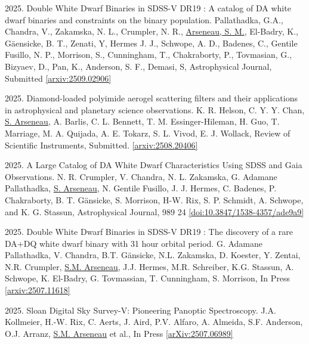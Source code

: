 \documentclass[letterpaper,11pt]{article}
\newenvironment{packed_enumerate}[1][]{
\begin{etaremune}[#1]
  \setlength{\itemsep}{3.7pt}
  \setlength{\parskip}{0pt}
  \setlength{\parsep}{0pt}}{\end{etaremune}
}
\begin{document}
\begin{packed_enumerate}

\item 2025. Double White Dwarf Binaries in SDSS-V DR19 : A catalog of DA white dwarf binaries and constraints on the binary population. Pallathadka, G.A., Chandra, V., Zakamska, N. L., Crumpler, N. R., \underline{Arseneau, S. M.}, El-Badry, K., G\"aensicke, B. T., Zenati, Y, Hermes J. J., Schwope, A. D., Badenes, C., Gentile Fusillo, N. P., Morrison, S., Cunningham, T., Chakraborty, P., Tovmasian, G., Bizyaev, D., Pan, K., Anderson, S. F., Demasi, S,  Astrophysical Journal, Submitted \href{https://arxiv.org/abs/2509.02906}{[arxiv:2509.02906]}

\item 2025. Diamond-loaded polyimide aerogel scattering filters and their applications in astrophysical and planetary science observations. K. R. Helson, C. Y. Y. Chan, \underline{S. Arseneau}, A. Barlis, C. L. Bennett, T. M. Essinger-Hileman, H. Guo, T. Marriage, M. A. Quijada, A. E. Tokarz, S. L. Vivod, E. J. Wollack, Review of Scientific Instruments, Submitted. \href{https://arxiv.org/abs/2508.20406}{[arxiv:2508.20406]}

\item 2025. A Large Catalog of DA White Dwarf Characteristics Using SDSS and Gaia Observations. N. R. Crumpler, V. Chandra, N. L. Zakamska, G. Adamane Pallathadka, \underline{S. Arseneau}, N. Gentile Fusillo, J. J. Hermes, C. Badenes, P. Chakraborty, B. T. G\"ansicke, S. Morrison, H-W. Rix, S. P. Schmidt, A. Schwope, and K. G. Stassun, Astrophysical Journal, 989 24 \href{https://doi.org/10.3847/1538-4357/ade9a9}{[doi:10.3847/1538-4357/ade9a9]}

\item 2025. Double White Dwarf Binaries in SDSS-V DR19 : The discovery of a rare DA+DQ white dwarf binary with 31 hour orbital period. G. Adamane Pallathadka, V. Chandra, B.T. G\"ansicke, N.L. Zakamska, D. Koester, Y. Zentai, N.R. Crumpler, \underline{S.M. Arseneau}, J.J. Hermes, M.R. Schreiber, K.G. Stassun, A. Schwope, K. El-Badry, G. Tovmassian, T. Cunningham, S. Morrison, In Press \href{https://arxiv.org/abs/2507.11618}{[arxiv:2507.11618]}

\item 2025. Sloan Digital Sky Survey-V: Pioneering Panoptic Spectroscopy. J.A. Kollmeier, H.-W. Rix, C. Aerts, J. Aird, P.V. Alfaro, A. Almeida, S.F. Anderson, O.J. Arranz, \underline{S.M. Arseneau} et al., In Press \href{https://https://arxiv.org/abs/2507.06989}{[arXiv:2507.06989]} 


\end{packed_enumerate}
\end{document}
